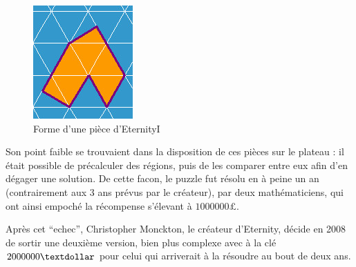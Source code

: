 \begin{figure}[H]
		\includegraphics[width=\linewidth]{images/eternity_1_piece.jpg}
		\caption{Forme d'une pièce d'EternityI}\label{fig:eternity_1_piece}
		\endminipage\hfill
	\end{figure}

	Son point faible se trouvaient dans la disposition de ces pièces sur le plateau : il était possible de précalculer des régions, puis de les comparer entre eux afin d'en dégager une solution.
	De cette facon, le puzzle fut résolu en à peine un an (contrairement aux 3 ans prévus par le créateur), par deux mathématiciens, qui ont ainsi empoché la récompense s'élevant à $1000000\pounds$.
	
	Après cet \enquote{echec}, Christopher Monckton, le créateur d'Eternity, décide en 2008 de sortir une deuxième version, bien plus complexe avec à la clé $2000000\textdollar$ pour celui qui arriverait à la résoudre au bout de deux ans.
	
